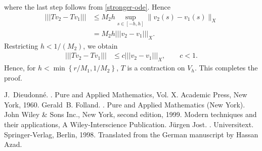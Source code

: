 \documentclass[12pt,reqno]{amsart}
\numberwithin{equation}{section}  %
\numberwithin{figure}{section}
\theoremstyle{plain}
\theoremstyle{definition}
\theoremstyle{remark}
\begin{document}
%
%
where the last step follows from \eqref{stronger-ode}.
Hence
\begin{equation*}
	\begin{split}
		| | | Tv_2 - Tv_1 | | | 
		& \le M_2 h \sup_{s \in [-h, h]} \| v_2(s)  - v_1 (s) \|_{ X}
		\\
		& = M_2 h   | | | v_2 - v_1 | | |_X.  
	\end{split}
\end{equation*}
%
%
Restricting $h < 1/(M_2)$, we obtain
\begin{equation*}
	\begin{split}
		| | | Tv_2 - Tv_1 | | | & \le c | | | v_2 - v_1 | | |_X, \qquad c <1. 
	\end{split}
\end{equation*}
Hence, for $h < \min\left\{r/M_1, 1/M_2  \right\}$, $T$ is a contraction on
$V_h$.  This completes the proof. \qquad \qedsymbol
%
%
%
\begin{thebibliography}{Die60}
J.~Dieudonn{{\'e}}.
.
\newblock Pure and Applied Mathematics, Vol. X. Academic Press, New York, 1960.
Gerald~B. Folland.
.
\newblock Pure and Applied Mathematics (New York). John Wiley \& Sons Inc., New
  York, second edition, 1999.
\newblock Modern techniques and their applications, A Wiley-Interscience
  Publication.
J{{\"u}}rgen Jost.
.
\newblock Universitext. Springer-Verlag, Berlin, 1998.
\newblock Translated from the German manuscript by Hassan Azad.
\end{thebibliography}
%
%
%
%
%
\end{document}
